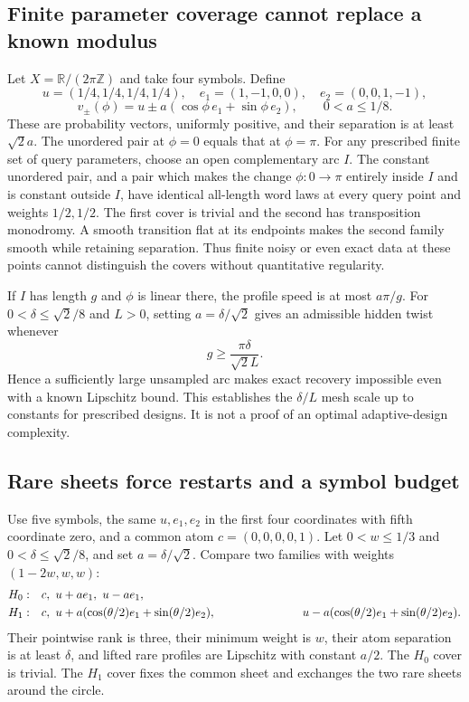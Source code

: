 \documentclass[11pt]{article}
\theoremstyle{remark}\newtheorem{remark}[theorem]{Remark}
\begin{document}
\subsection{Finite parameter coverage cannot replace a known modulus}
Let $X=\mathbb R/(2\pi\mathbb Z)$ and take four symbols. Define
\[
 u=(1/4,1/4,1/4,1/4),\quad e_1=(1,-1,0,0),\quad e_2=(0,0,1,-1),
\]
\[
 v_\pm(\phi)=u\pm a(\cos\phi\,e_1+\sin\phi\,e_2),\qquad
 0<a\leq1/8.
\]
These are probability vectors, uniformly positive, and their separation is at least $\sqrt2a$. The unordered pair at $\phi=0$ equals that at $\phi=\pi$.
For any prescribed finite set of query parameters, choose an open complementary arc $I$. The constant unordered pair, and a pair which makes the change $\phi:0\to\pi$ entirely inside $I$ and is constant outside $I$, have identical all-length word laws at every query point and weights $1/2,1/2$. The first cover is trivial and the second has transposition monodromy. A smooth transition flat at its endpoints makes the second family smooth while retaining separation. Thus finite noisy or even exact data at these points cannot distinguish the covers without quantitative regularity.

If $I$ has length $g$ and $\phi$ is linear there, the profile speed is at most $a\pi/g$. For $0<\delta\leq\sqrt2/8$ and $L>0$, setting $a=\delta/\sqrt2$ gives an admissible hidden twist whenever
\[
 g\geq\frac{\pi\delta}{\sqrt2L}.
\]
Hence a sufficiently large unsampled arc makes exact recovery impossible even with a known Lipschitz bound. This establishes the $\delta/L$ mesh scale up to constants for prescribed designs. It is not a proof of an optimal adaptive-design complexity.

\subsection{Rare sheets force restarts and a symbol budget}
Use five symbols, the same $u,e_1,e_2$ in the first four coordinates with fifth coordinate zero, and a common atom $c=(0,0,0,0,1)$. Let $0<w\leq1/3$ and $0<\delta\leq\sqrt2/8$, and set $a=\delta/\sqrt2$. Compare two families with weights $(1-2w,w,w)$:
\begin{align*}
 H_0:\quad& c,\ u+ae_1,\ u-ae_1,\\
 H_1:\quad& c,\ u+a(\cos(\theta/2)e_1+\sin(\theta/2)e_2),\
 &\hspace{22mm}u-a(\cos(\theta/2)e_1+\sin(\theta/2)e_2).
\end{align*}
Their pointwise rank is three, their minimum weight is $w$, their atom separation is at least $\delta$, and lifted rare profiles are Lipschitz with constant $a/2$. The $H_0$ cover is trivial. The $H_1$ cover fixes the common sheet and exchanges the two rare sheets around the circle.
\end{document}

